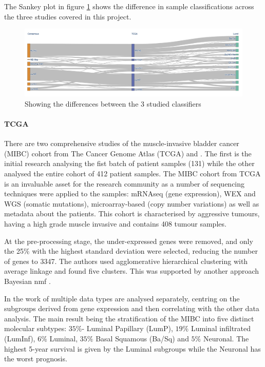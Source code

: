 The Sankey plot in figure \cref{fig:lit:classifier_comp} shows the difference in sample classifications across the three studies covered in this project.

\begin{figure}[!htb]   
\centering
\includegraphics[width=1.0\textwidth,height=1.0\textheight,keepaspectratio]{Sections/Lit_review/Resources/classifier_differences.png}
  \caption{Showing the differences between the 3 studied classifiers}
\label{fig:lit:classifier_comp}
\end{figure}
\FloatBarrier

\paragraph*{TCGA} \label{s:lit:tcga_mibc}

There are two comprehensive studies of the muscle-invasive bladder cancer (MIBC) cohort from The Cancer Genome Atlas (TCGA) \citet{Tcga2014-dr} and \citet{Robertson2017-mg}. The first is the initial research analysing the fist batch of patient samples (131) while the other analysed the entire cohort of 412 patient samples. The MIBC cohort from TCGA is an invaluable asset for the research community as a number of sequencing techniques were applied to the samples: mRNAseq (gene expression), WEX and WGS (somatic mutations), microarray-based (copy number variations) as well as metadata about the patients. This cohort is characterised by aggressive tumours, having a high grade muscle invasive and contains 408 tumour samples.

At the pre-processing stage, the under-expressed genes were removed, and only the 25\% with the highest standard deviation were selected, reducing the number of genes to 3347. The authors used agglomerative hierarchical clustering with average linkage and found five clusters. This was supported by another approach Bayesian \acrfull{nmf} \cite{Schmidt2009-zh}.

In the work of \citet{Robertson2017-mg} multiple data types are analysed separately, centring on the subgroups derived from gene expression and then correlating with the other data analysis. The main result being the stratification of the MIBC into five distinct molecular subtypes: $35\%$- Luminal Papillary (LumP), $19\%$ Luminal infiltrated (LumInf), $6\%$ Luminal, $35\%$ Basal Squamous (Ba/Sq) and $5\%$ Neuronal. The highest 5-year survival is given by the Luminal subgroups while the Neuronal has the worst prognosis. 

